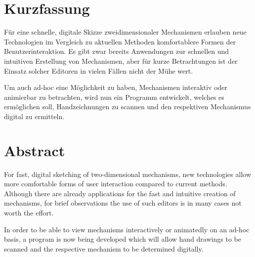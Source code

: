 \section*{Kurzfassung}
Für eine schnelle, digitale Skizze zweidimensionaler Mechanismen erlauben neue Technologien im Vergleich zu aktuellen Methoden komfortablere Formen der Benutzerinteraktion.
Es gibt zwar bereits Anwendungen zur schnellen und intuitiven Erstellung von Mechanismen, aber für kurze Betrachtungen ist der Einsatz solcher Editoren in vielen Fällen nicht der Mühe wert.

Um auch ad-hoc eine Möglichkeit zu haben, Mechanismen interaktiv oder animierbar zu betrachten, wird nun ein Programm entwickelt, welches es ermöglichen soll, Handzeichnungen zu scannen und den respektiven Mechanismus digital zu ermitteln.

\section*{Abstract}
For fast, digital sketching of two-dimensional mechanisms, new technologies allow more comfortable forms of user interaction compared to current methods.
Although there are already applications for the fast and intuitive creation of mechanisms, for brief observations the use of such editors is in many cases not worth the effort.

In order to be able to view mechanisms interactively or animatedly on an ad-hoc basis, a program is now being developed which will allow hand drawings to be scanned and the respective mechanism to be determined digitally.
